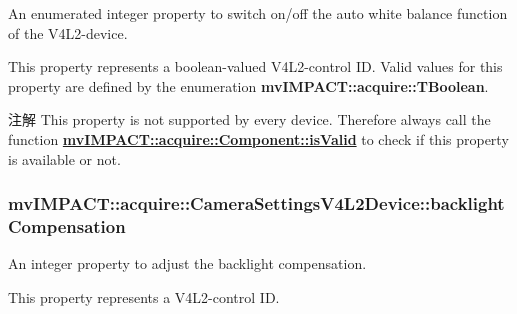 An enumerated integer property to switch on/off the auto white balance function of the V4\+L2-\/device. 

This property represents a boolean-\/valued V4\+L2-\/control I\+D. Valid values for this property are defined by the enumeration {\bfseries mv\+I\+M\+P\+A\+C\+T\+::acquire\+::\+T\+Boolean}.

\begin{DoxyNote}{注解}
This property is not supported by every device. Therefore always call the function {\bfseries \hyperlink{classmv_i_m_p_a_c_t_1_1acquire_1_1_component_ac51e55e7e046101f3c6119d84123abd5}{mv\+I\+M\+P\+A\+C\+T\+::acquire\+::\+Component\+::is\+Valid}} to check if this property is available or not. 
\end{DoxyNote}
\hypertarget{classmv_i_m_p_a_c_t_1_1acquire_1_1_camera_settings_v4_l2_device_ae3a03df1b438f1cf58bb601f5514c689}{
\subsubsection[{backlight\+Compensation}]{ mv\+I\+M\+P\+A\+C\+T\+::acquire\+::\+Camera\+Settings\+V4\+L2\+Device\+::backlight\+Compensation}}\label{classmv_i_m_p_a_c_t_1_1acquire_1_1_camera_settings_v4_l2_device_ae3a03df1b438f1cf58bb601f5514c689}


An integer property to adjust the backlight compensation. 

This property represents a V4\+L2-\/control I\+D.

